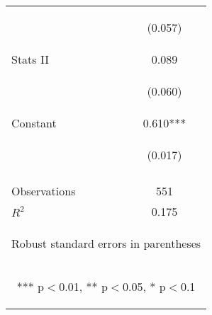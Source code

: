 \documentclass{article} %
\begin{document}
\begin{table}[H]
\begin{center}
\begin{tabular}{lc}
\vspace{4pt} & \begin{footnotesize}(0.057)\end{footnotesize} \\
Stats II & 0.089 \\
\vspace{4pt} & \begin{footnotesize}(0.060)\end{footnotesize} \\
Constant & 0.610*** \\
 & \begin{footnotesize}(0.017)\end{footnotesize} \\
\vspace{4pt} & \begin{footnotesize}\end{footnotesize} \\
Observations & 551 \\
 $R^2$ & 0.175 \\ \hline
\multicolumn{2}{c}{\begin{footnotesize} Robust standard errors in parentheses\end{footnotesize}} \\
\multicolumn{2}{c}{\begin{footnotesize} *** p$<$0.01, ** p$<$0.05, * p$<$0.1\end{footnotesize}} \\
\end{tabular}
\end{center}


\end{table}
\end{document}
